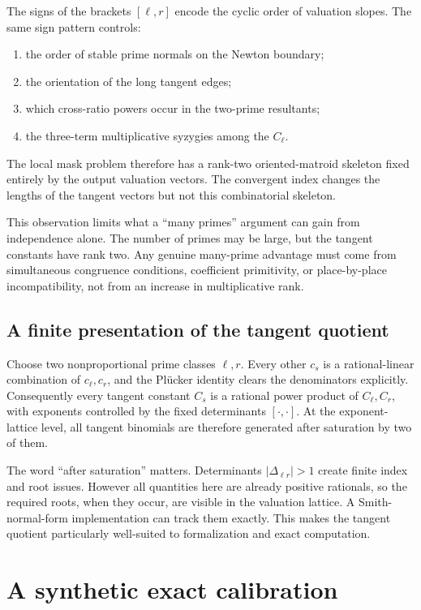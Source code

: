 \documentclass[11pt,oneside]{article}
\theoremstyle{definition}
\theoremstyle{remark}
\begin{document}
The signs of the brackets $[\ell,r]$ encode the cyclic order of valuation slopes.  The same
sign pattern controls:
\begin{enumerate}
\item the order of stable prime normals on the Newton boundary;
\item the orientation of the long tangent edges;
\item which cross-ratio powers occur in the two-prime resultants;
\item the three-term multiplicative syzygies among the $C_\ell$.
\end{enumerate}
The local mask problem therefore has a rank-two oriented-matroid skeleton fixed entirely by
the output valuation vectors.  The convergent index changes the lengths of the tangent
vectors but not this combinatorial skeleton.

This observation limits what a ``many primes'' argument can gain from independence alone.
The number of primes may be large, but the tangent constants have rank two.  Any genuine
many-prime advantage must come from simultaneous congruence conditions, coefficient
primitivity, or place-by-place incompatibility, not from an increase in multiplicative rank.

\subsection{A finite presentation of the tangent quotient}

Choose two nonproportional prime classes $\ell,r$.  Every other $c_s$ is a rational-linear
combination of $c_\ell,c_r$, and the Pl\"ucker identity clears the denominators explicitly.
Consequently every tangent constant $C_s$ is a rational power product of $C_\ell,C_r$, with
exponents controlled by the fixed determinants $[\cdot,\cdot]$.  At the exponent-lattice
level, all tangent binomials are therefore generated after saturation by two of them.

The word ``after saturation'' matters.  Determinants $|\Delta_{\ell r}|>1$ create finite
index and root issues.  However all quantities here are already positive rationals, so the
required roots, when they occur, are visible in the valuation lattice.  A Smith-normal-form
implementation can track them exactly.  This makes the tangent quotient particularly
well-suited to formalization and exact computation.

\section{A synthetic exact calibration}
\label{sec:calibration}
\end{document}
